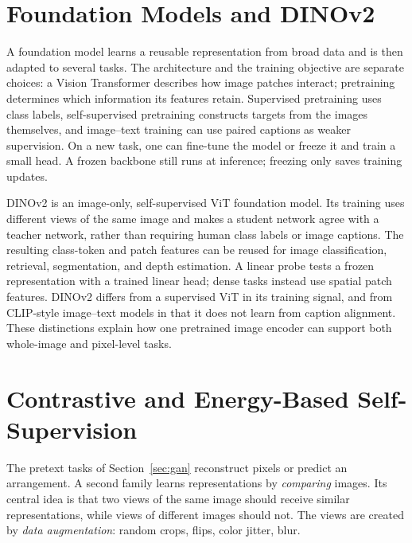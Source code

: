 \newpage
\section{Foundation Models and DINOv2}
\label{app:foundation}

A foundation model learns a reusable representation from broad data and is
then adapted to several tasks. The architecture and the training objective are
separate choices: a Vision Transformer describes how image patches interact;
pretraining determines which information its features retain. Supervised
pretraining uses class labels, self-supervised pretraining constructs targets
from the images themselves, and image--text training can use paired captions
as weaker supervision. On a new task, one can fine-tune the model or freeze it
and train a small head. A frozen backbone still runs at inference; freezing
only saves training updates.

DINOv2 is an image-only, self-supervised ViT foundation model. Its training
uses different views of the same image and makes a student network agree with
a teacher network, rather than requiring human class labels or image captions.
The resulting class-token and patch features can be reused for image
classification, retrieval, segmentation, and depth estimation. A linear probe
tests a frozen representation with a trained linear head; dense tasks instead
use spatial patch features. DINOv2 differs from a supervised ViT in its
training signal, and from CLIP-style image--text models in that it does not
learn from caption alignment. These distinctions explain how one pretrained
image encoder can support both whole-image and pixel-level tasks.

\section{Contrastive and Energy-Based Self-Supervision}
\label{app:ssl}

The pretext tasks of Section~\ref{sec:gan} reconstruct pixels or predict an
arrangement. A second family learns representations by \emph{comparing}
images. Its central idea is that two views of the same image should receive
similar representations, while views of different images should not. The views
are created by \emph{data augmentation}: random crops, flips, color jitter,
blur.

